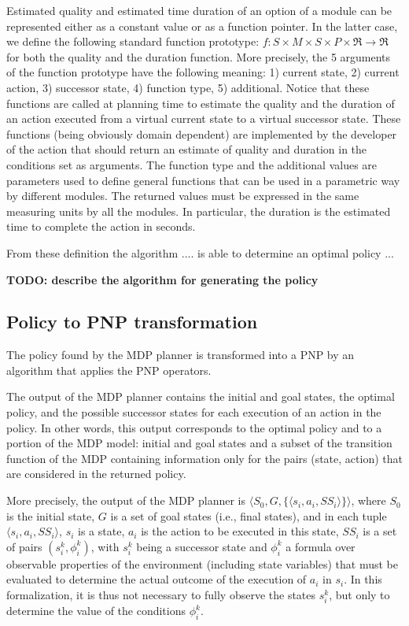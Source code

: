 Estimated quality and estimated time duration of an option of a module can be represented either as a constant value or as a function pointer. In the latter case, we define the following standard function prototype: $f : S \times M \times S \times P \times \Re \rightarrow \Re$ for both the quality and the duration function. More precisely, the 5 arguments of the function prototype have the following meaning: 1) current state, 2) current action, 3) successor state, 4) function type, 5) additional. Notice that these functions are called at planning time to estimate the quality and the duration of an action executed from a virtual current state to a virtual successor state. These functions (being obviously domain dependent) are implemented by the developer of the action that should return an estimate of quality and duration in the  conditions set as arguments. The function type and the additional values are parameters used to define general functions that can be used in a parametric way by different modules.
The returned values must be expressed in the same measuring units by all the modules. In particular, the duration is the estimated time to complete the action in seconds.

From these definition the algorithm .... is able to determine an optimal policy ...

{\bf TODO: describe the algorithm for generating the policy}




\subsection{Policy to PNP transformation}

The policy found by the MDP planner is transformed into a PNP by an algorithm that applies the PNP operators. 

The output of the MDP planner contains the initial and goal states,  the optimal policy, and the possible successor states for each execution of an action in the policy. In other words, this output corresponds to the optimal policy and to a portion of the MDP model: initial and goal states and a subset of the transition function of the MDP containing information only for the pairs (state, action) that are considered in the returned policy.

More precisely, the output of the MDP planner is $\langle S_0, G, \{ \langle s_i, a_i, SS_i \rangle \} \rangle $,  
where $S_0$ is the initial state, $G$ is a set of goal states (i.e., final states),
and in each tuple $\langle s_i, a_i, SS_i \rangle$, $s_i$ is a state, $a_i$ is the action to be executed in this state, $SS_i$ is a set of pairs $(s_i^k, \phi_i^k)$, with $s_i^k$ being a successor state and $\phi_i^k$ a formula over observable properties of the environment (including state variables) that  must be evaluated to determine the actual outcome of the execution of $a_i$ in $s_i$.
In this formalization, it is thus not necessary to fully observe the states $s_i^k$, but only to determine the value of the conditions $\phi_i^k$.

